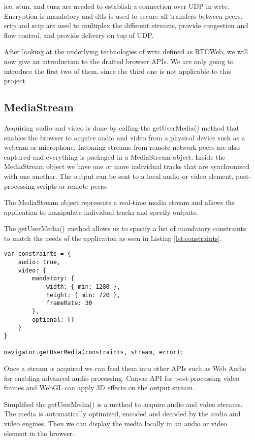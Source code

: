 \gls{ice}, \gls{stun}, and \gls{turn} are needed to establish a connection over UDP in \gls{wrtc}. Encryption is mandatory and \gls{dtls} is used to secure all transfers between peers. \gls{srtp} and \gls{sctp} are used to multiplex the different streams, provide congestion and flow control, and provide delivery on top of UDP.

After looking at the underlying technologies of \gls{wrtc} defined as RTCWeb, we will now give an introduction to the drafted browser APIs. We are only going to introduce the first two of them, since the third one is not applicable to this project.

\subsection{MediaStream}
Acquiring audio and video is done by calling the getUserMedia() method that enables the browser to acquire audio and video from a physical device such as a webcam or microphone. Incoming streams from remote network peers are also captured and everything is packaged in a MediaStream object. Inside the MediaStream object we have one or more individual tracks that are synchronized with one another. The output can be sent to a local audio or video element, post-processing scripts or remote peers.

The MediaStream object represents a real-time media stream and allows the application to manipulate individual tracks and specify outputs.

The getUserMedia() method allows us to specify a list of mandatory constraints to match the needs of the application as seen in Listing \ref{lst:constraints}.

\lstset{language=Javascript} 
\begin{lstlisting}[caption={getUserMedia constraints object}, label={lst:constraints}]
var constraints = {
	audio: true,
	video: {
		mandatory: {
			width: { min: 1280 },
			height: { min: 720 },
			frameRate: 30
		},
		optional: []
	}
}

navigator.getUserMedia(constraints, stream, error);
\end{lstlisting}

Once a stream is acquired we can feed them into other APIs such as Web Audio for enabling advanced audio processing. Canvas API for post-processing video frames and WebGL can apply 3D effects on the output stream.

Simplified the getUserMedia() is a method to acquire audio and video streams. The media is automatically optimized, encoded and decoded by the audio and video engines. Then we can display the media locally in an audio or video element in the browser.


